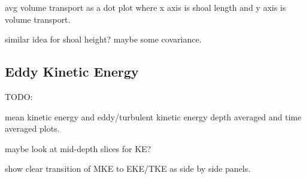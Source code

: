 avg volume transport as a dot plot where x axis is shoal length and y axis is volume transport. 

similar idea for shoal height? maybe some covariance. 


\subsection{Eddy Kinetic Energy}

TODO:

mean kinetic energy and eddy/turbulent kinetic energy depth averaged and time averaged plots. 

maybe look at mid-depth slices for KE? 

show clear transition of MKE to EKE/TKE as side by side panels. 









